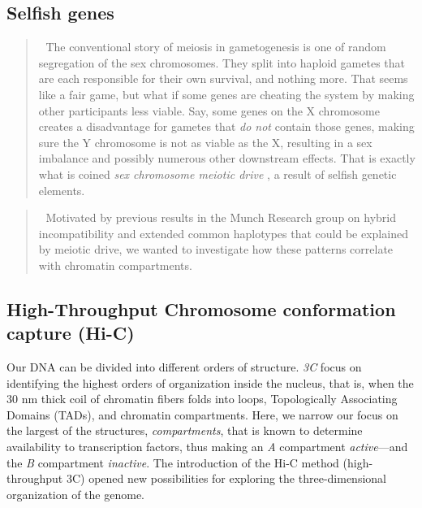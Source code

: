 \documentclass[
  a4paper,
  DIV=11,
  numbers=noendperiod]{scrartcl}
\begin{document}
\subsection{Selfish genes}\label{selfish-genes}

\begin{quote}
{📝} The conventional story of meiosis in gametogenesis is one of random
segregation of the sex chromosomes. They split into haploid gametes that
are each responsible for their own survival, and nothing more. That
seems like a fair game, but what if some genes are cheating the system
by making other participants less viable. Say, some genes on the X
chromosome creates a disadvantage for gametes that \emph{do not} contain
those genes, making sure the Y chromosome is not as viable as the X,
resulting in a sex imbalance and possibly numerous other downstream
effects. That is exactly what is coined \emph{sex chromosome meiotic
drive} \citep{jaenike_sex_2001}, a result of selfish genetic elements.
\end{quote}

\begin{quote}
{📝} Motivated by previous results in the Munch Research group
\citep{munch_group_2024} on hybrid incompatibility and extended common
haplotypes \citep{skov_extraordinary_2023, sorensen_genome_wide_2023}
that could be explained by meiotic drive, we wanted to investigate how
these patterns correlate with chromatin compartments.
\end{quote}

\subsection{High-Throughput Chromosome conformation capture
(Hi-C)}\label{high-throughput-chromosome-conformation-capture-hi-c}

Our DNA can be divided into different orders of structure. \emph{3C}
focus on identifying the highest orders of organization inside the
nucleus, that is, when the 30 nm thick coil of chromatin fibers folds
into loops, Topologically Associating Domains (TADs), and chromatin
compartments. Here, we narrow our focus on the largest of the
structures, \emph{compartments}, that is known to determine availability
to transcription factors, thus making an \emph{A} compartment
\emph{active}---and the \emph{B} compartment \emph{inactive}. The
introduction of the Hi-C method
\citep{lieberman_aiden_comprehensive_2009} (high-throughput 3C) opened
new possibilities for exploring the three-dimensional organization of
the genome.
\end{document}
